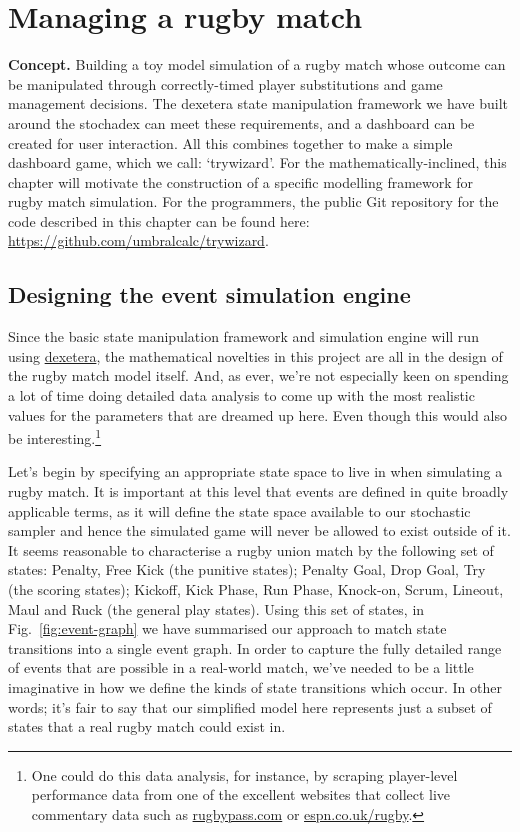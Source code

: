 \chapter{\sffamily Managing a rugby match}

{\bfseries\sffamily Concept.} Building a toy model simulation of a rugby match whose outcome can be manipulated through correctly-timed player substitutions and game management decisions. The dexetera state manipulation framework we have built around the stochadex can meet these requirements, and a dashboard can be created for user interaction. All this combines together to make a simple dashboard game, which we call: `trywizard'. For the mathematically-inclined, this chapter will motivate the construction of a specific modelling framework for rugby match simulation. For the programmers, the public Git repository for the code described in this chapter can be found here: \href{https://github.com/umbralcalc/trywizard}{https://github.com/umbralcalc/trywizard}.

\section{\sffamily Designing the event simulation engine}

Since the basic state manipulation framework and simulation engine will run using \href{https://github.com/umbralcalc/dexetera}{dexetera}, the mathematical novelties in this project are all in the design of the rugby match model itself. And, as ever, we're not especially keen on spending a lot of time doing detailed data analysis to come up with the most realistic values for the parameters that are dreamed up here. Even though this would also be interesting.\footnote{One could do this data analysis, for instance, by scraping player-level performance data from one of the excellent websites that collect live commentary data such as \href{https://www.rugbypass.com/}{rugbypass.com} or \href{https://www.espn.co.uk/rugby/}{espn.co.uk/rugby}.}

Let's begin by specifying an appropriate state space to live in when simulating a rugby match. It is important at this level that events are defined in quite broadly applicable terms, as it will define the state space available to our stochastic sampler and hence the simulated game will never be allowed to exist outside of it. It seems reasonable to characterise a rugby union match by the following set of states: {\sf Penalty}, {\sf Free Kick} (the punitive states); {\sf Penalty Goal}, {\sf Drop Goal}, {\sf Try} (the scoring states); {\sf Kickoff}, {\sf Kick Phase}, {\sf Run Phase}, {\sf Knock-on}, {\sf Scrum}, {\sf Lineout}, {\sf Maul} and {\sf Ruck} (the general play states). Using this set of states, in Fig.~\ref{fig:event-graph} we have summarised our approach to match state transitions into a single event graph. In order to capture the fully detailed range of events that are possible in a real-world match, we've needed to be a little imaginative in how we define the kinds of state transitions which occur. In other words; it's fair to say that our simplified model here represents just a subset of states that a real rugby match could exist in.

